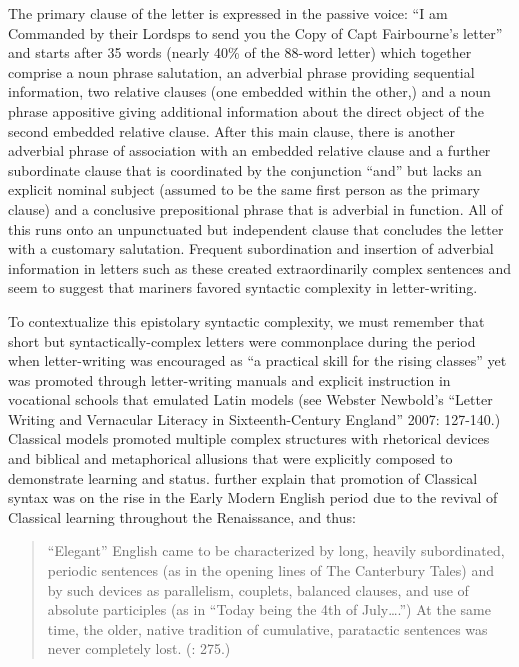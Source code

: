 The primary clause of the letter is expressed in the passive voice: “I am Commanded by their Lordsps to send you the Copy of Capt Fairbourne’s letter” and starts after 35 words (nearly 40\% of the 88-word letter) which together comprise a noun phrase salutation, an adverbial phrase providing sequential information, two relative clauses (one embedded within the other,) and a noun phrase appositive giving additional information about the direct object of the second embedded relative clause. After this main clause, there is another adverbial phrase of association with an embedded relative clause and a further subordinate clause that is coordinated by the conjunction “and” but lacks an explicit nominal subject (assumed to be the same first person as the primary clause) and a conclusive prepositional phrase that is adverbial in function. All of this runs onto an unpunctuated but independent clause that concludes the letter with a customary salutation. Frequent subordination and insertion of adverbial information in letters such as these created extraordinarily complex sentences and seem to suggest that mariners favored syntactic complexity in letter-writing.  

To contextualize this epistolary syntactic complexity, we must remember that short but syntactically-complex letters were commonplace during the period when letter-writing was encouraged as “a practical skill for the rising classes” \citep[178,]{Mitchell2007} yet was promoted through letter-writing manuals and explicit instruction in vocational schools that emulated Latin models (see Webster Newbold’s “Letter Writing and Vernacular Literacy in Sixteenth-Century England” 2007: 127-140.) Classical models promoted multiple complex structures with rhetorical devices and biblical and metaphorical allusions that were explicitly composed to demonstrate learning and status. \citet{MillwardHayes2012} further explain that promotion of Classical syntax was on the rise in the Early Modern English period due to the revival of Classical learning throughout the Renaissance, and thus:

\begin{quotation}
“Elegant” English came to be characterized by long, heavily subordinated, periodic sentences (as in the opening lines of The Canterbury Tales) and by such devices as parallelism, couplets, balanced clauses, and use of absolute participles (as in “Today being the 4th of July….”) At the same time, the older, native tradition of cumulative, paratactic sentences was never completely lost. (\citealt{MillwardHayes2012}: 275.)\end{quotation}

